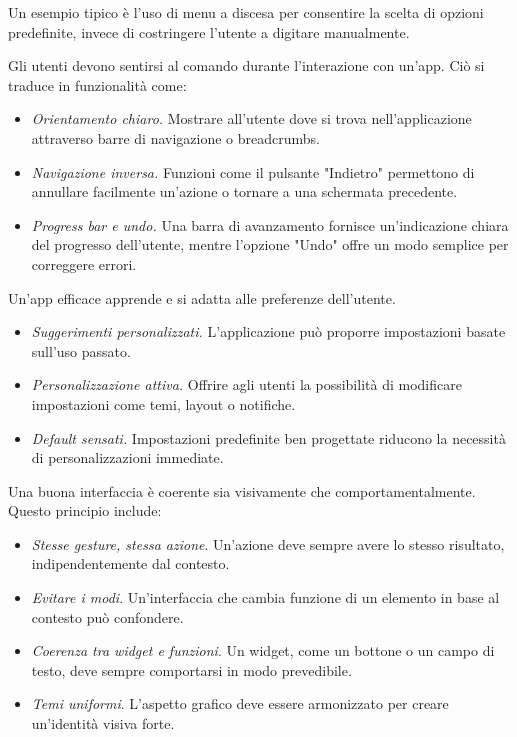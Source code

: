 Un esempio tipico è l'uso di menu a discesa per consentire la scelta di opzioni predefinite, invece di costringere l'utente a digitare manualmente.

Gli utenti devono sentirsi al comando durante l'interazione con un'app. Ciò si traduce in funzionalità come:
\begin{itemize}
    \item \textit{Orientamento chiaro.} Mostrare all'utente dove si trova nell'applicazione attraverso barre di navigazione o breadcrumbs.
    \item \textit{Navigazione inversa.} Funzioni come il pulsante "Indietro" permettono di annullare facilmente un'azione o tornare a una schermata precedente.
    \item \textit{Progress bar e undo.} Una barra di avanzamento fornisce un'indicazione chiara del progresso dell'utente, mentre l'opzione "Undo" offre un modo semplice per correggere errori.
\end{itemize}
Un'app efficace apprende e si adatta alle preferenze dell'utente.
\begin{itemize}
    \item \textit{Suggerimenti personalizzati.} L'applicazione può proporre impostazioni basate sull'uso passato.
    \item \textit{Personalizzazione attiva.} Offrire agli utenti la possibilità di modificare impostazioni come temi, layout o notifiche.
    \item \textit{Default sensati.} Impostazioni predefinite ben progettate riducono la necessità di personalizzazioni immediate.
\end{itemize}
Una buona interfaccia è coerente sia visivamente che comportamentalmente. Questo principio include:
\begin{itemize}
    \item \textit{Stesse gesture, stessa azione}. Un'azione deve sempre avere lo stesso risultato, indipendentemente dal contesto.
    \item \textit{Evitare i modi}. Un’interfaccia che cambia funzione di un elemento in base al contesto può confondere.
    \item \textit{Coerenza tra widget e funzioni}. Un widget, come un bottone o un campo di testo, deve sempre comportarsi in modo prevedibile.
    \item \textit{Temi uniformi}. L'aspetto grafico deve essere armonizzato per creare un'identità visiva forte.
\end{itemize}

